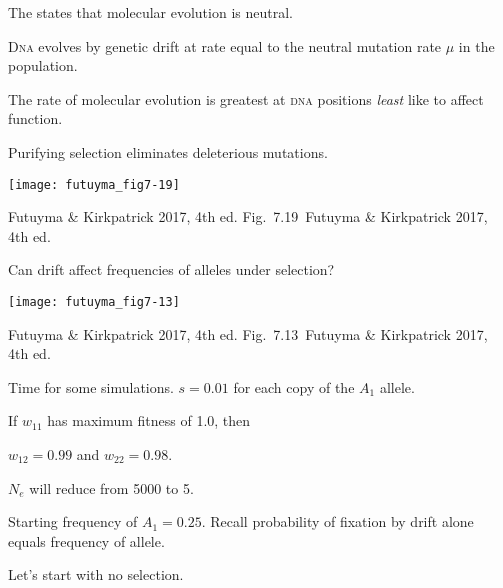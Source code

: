 \documentclass[t]{beamer}
\newcommand{\futuyma}[1]{%
	\ifthenelse{\isempty{#1}}%
	{Futuyma \& Kirkpatrick 2017, 4th ed.}%
	{Fig.~#1~Futuyma \& Kirkpatrick 2017, 4th ed.}%
}
\newcommand{\backskip}{\vspace{-0.5\baselineskip}}
\begin{document}

\begin{frame}{The  states that molecular evolution is neutral.}

\backskip

\begin{multicols}{2}
\hangpara D\textsc{na} evolves by genetic drift at  rate equal to the neutral mutation rate $\mu$ in the population.

\hangpara The rate of molecular evolution is greatest at \textsc{dna} positions \emph{least} like to affect function.

\hangpara Purifying selection eliminates deleterious mutations.

\columnbreak

\noindent \texttt{[image: futuyma\_fig7-19]}

\end{multicols}

\vfilll

\tinyfill \futuyma{7.19}

\end{frame}


\begin{frame}{Can drift affect frequencies of alleles under selection?}

\backskip

\centering

\texttt{[image: futuyma\_fig7-13]}

\vfilll

\tinyfill \futuyma{7.13}

\end{frame}


\begin{frame}{Time for some simulations.}
\hangpara $s = 0.01$ for each copy of the $A_1$ allele.

\hangpara If $w_{11}$ has maximum fitness of 1.0, then

\hangpara $w_{12} = 0.99$ and $w_{22} = 0.98.$

\hangpara $N_e$ will reduce from 5000 to 5.

\hangpara Starting frequency of $A_1 = 0.25$. Recall probability of fixation by drift alone equals frequency of allele.

\hangpara Let's start with no selection.


\end{frame}
\end{document}
